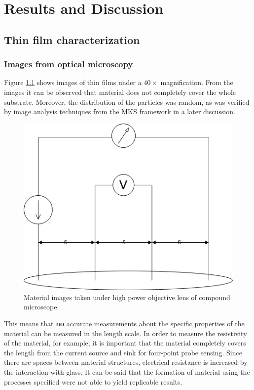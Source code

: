 \chapter{Results and Discussion}

\section{Thin film characterization}
\subsection{Images from optical microscopy}

Figure \ref{fig:hpo} shows images of thin films under a $40\times$ magnification.
From the images it can be observed that material does not completely cover the whole substrate.
Moreover, the distribution of the particles was random, as was verified by image analysis techniques from the MKS framework in a later discussion.

\begin{figure}
  \centering
  \includegraphics[scale=0.3]{FourPoint.png}
  \caption[Material images under HPO]{Material images taken under high power objective lens of compound microscope.}
  \label{fig:hpo}
\end{figure}

This means that \textbf{no} accurate measurements about the specific properties of the material can be measured in the length scale.
In order to measure the resistivity of the material, for example, it is important that the material completely covers the length from the current source and sink for four-point probe sensing.
Since there are spaces between material structures, electrical resistance is increased by the interaction with glass.
It can be said that the formation of material using the processes specified were not able to yield replicable results.

